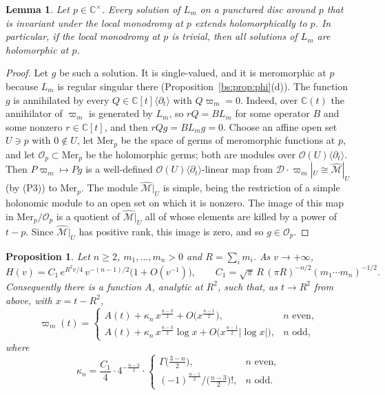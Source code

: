 \documentclass[11pt,a4paper]{article}
\newtheorem{proposition}[theorem]{Proposition}
\newtheorem{lemma}[theorem]{Lemma}
\theoremstyle{definition}
\theoremstyle{remark}
\numberwithin{equation}{section}
\newcommand{\C}{\mathbb{C}}
\newcommand{\cD}{\mathcal{D}}
\newcommand{\cM}{\mathcal{M}}
\newcommand{\cO}{\mathcal{O}}
\newcommand{\Mhat}{\widehat{\cM}}
\begin{document}
\begin{lemma}\label{bs:lem:holo}
Let $p\in\C^\times$. Every solution of $L_m$ on a punctured disc around $p$ that is invariant under the local monodromy at $p$ extends holomorphically to $p$. In particular, if the local monodromy at $p$ is trivial, then all solutions of $L_m$ are holomorphic at $p$.
\end{lemma}

\begin{proof}
Let $g$ be such a solution. It is single-valued, and it is meromorphic at $p$ because $L_m$ is regular singular there (Proposition~\ref{bs:prop:phi}(d)). The function $g$ is annihilated by every $Q\in\C[t]\langle\partial_t\rangle$ with $Q\varpi_m=0$. Indeed, over $\C(t)$ the annihilator of $\varpi_m$ is generated by $L_m$, so $rQ=BL_m$ for some operator $B$ and some nonzero $r\in\C[t]$, and then $rQg=BL_mg=0$. Choose an affine open set $U\ni p$ with $0\notin U$, let $\mathrm{Mer}_p$ be the space of germs of meromorphic functions at $p$, and let $\cO_p\subset\mathrm{Mer}_p$ be the holomorphic germs; both are modules over $\cO(U)\langle\partial_t\rangle$. Then $P\varpi_m\mapsto Pg$ is a well-defined $\cO(U)\langle\partial_t\rangle$-linear map from $\cD\cdot\varpi_m|_U\cong\Mhat|_U$ (by (P3)) to $\mathrm{Mer}_p$. The module $\Mhat|_U$ is simple, being the restriction of a simple holonomic module to an open set on which it is nonzero. The image of this map in $\mathrm{Mer}_p/\cO_p$ is a quotient of $\Mhat|_U$ all of whose elements are killed by a power of $t-p$. Since $\Mhat|_U$ has positive rank, this image is zero, and so $g\in\cO_p$.
\end{proof}

\begin{proposition}\label{bs:prop:normal}
Let $n\ge2$, $m_1,\dots,m_n>0$ and $R=\sum_im_i$. As $v\to+\infty$,
\[
H(v)=C_1\,e^{R^2v/4}\,v^{-(n-1)/2}\bigl(1+O(v^{-1})\bigr),\qquad C_1=\sqrt\pi\,R\,(\pi R)^{-n/2}(m_1\cdots m_n)^{-1/2}.
\]
Consequently there is a function $A$, analytic at $R^2$, such that, as $t\to R^2$ from above, with $x=t-R^2$,
\[
\varpi_m(t)=\begin{cases}A(t)+\kappa_n\,x^{\frac{n-3}2}+O\bigl(x^{\frac{n-1}2}\bigr),& n\text{ even},\\[3pt] A(t)+\kappa_n\,x^{\frac{n-3}2}\log x+O\bigl(x^{\frac{n-1}2}|\log x|\bigr),& n\text{ odd},\end{cases}
\]
where
\begin{equation}\label{bs:eq:kappa}
\kappa_n=\frac{C_1}{4}\cdot4^{-\frac{n-3}2}\cdot\begin{cases}\Gamma\bigl(\frac{3-n}2\bigr),& n\text{ even},\\[2pt] (-1)^{\frac{n-1}2}\big/\bigl(\frac{n-3}2\bigr)!,& n\text{ odd}.\end{cases}
\end{equation}
\end{proposition}
\end{document}
